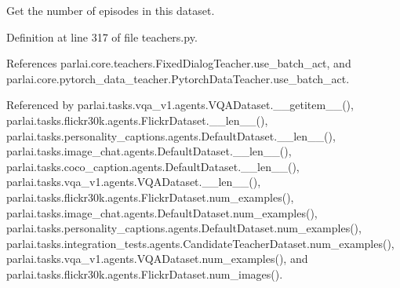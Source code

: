 \begin{DoxyVerb}Get the number of episodes in this dataset.\end{DoxyVerb}
 

Definition at line 317 of file teachers.\+py.



References parlai.\+core.\+teachers.\+Fixed\+Dialog\+Teacher.\+use\+\_\+batch\+\_\+act, and parlai.\+core.\+pytorch\+\_\+data\+\_\+teacher.\+Pytorch\+Data\+Teacher.\+use\+\_\+batch\+\_\+act.



Referenced by parlai.\+tasks.\+vqa\+\_\+v1.\+agents.\+V\+Q\+A\+Dataset.\+\_\+\+\_\+getitem\+\_\+\+\_\+(), parlai.\+tasks.\+flickr30k.\+agents.\+Flickr\+Dataset.\+\_\+\+\_\+len\+\_\+\+\_\+(), parlai.\+tasks.\+personality\+\_\+captions.\+agents.\+Default\+Dataset.\+\_\+\+\_\+len\+\_\+\+\_\+(), parlai.\+tasks.\+image\+\_\+chat.\+agents.\+Default\+Dataset.\+\_\+\+\_\+len\+\_\+\+\_\+(), parlai.\+tasks.\+coco\+\_\+caption.\+agents.\+Default\+Dataset.\+\_\+\+\_\+len\+\_\+\+\_\+(), parlai.\+tasks.\+vqa\+\_\+v1.\+agents.\+V\+Q\+A\+Dataset.\+\_\+\+\_\+len\+\_\+\+\_\+(), parlai.\+tasks.\+flickr30k.\+agents.\+Flickr\+Dataset.\+num\+\_\+examples(), parlai.\+tasks.\+image\+\_\+chat.\+agents.\+Default\+Dataset.\+num\+\_\+examples(), parlai.\+tasks.\+personality\+\_\+captions.\+agents.\+Default\+Dataset.\+num\+\_\+examples(), parlai.\+tasks.\+integration\+\_\+tests.\+agents.\+Candidate\+Teacher\+Dataset.\+num\+\_\+examples(), parlai.\+tasks.\+vqa\+\_\+v1.\+agents.\+V\+Q\+A\+Dataset.\+num\+\_\+examples(), and parlai.\+tasks.\+flickr30k.\+agents.\+Flickr\+Dataset.\+num\+\_\+images().

